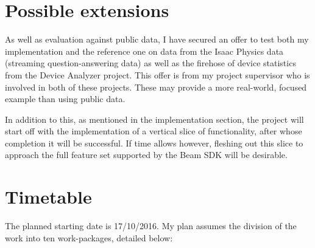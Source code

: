 \documentclass[11pt]{scrartcl}
\begin{document}
\section*{Possible extensions}

As well as evaluation against public data, I have secured an offer to test both my implementation and the reference one on data from the Isaac Physics \cite{Isaac} data (streaming question-answering data) as well as the firehose of device statistics from the Device Analyzer \cite{Device} project. This offer is from my project supervisor who is involved in both of these projects. These may provide a more real-world, focused example than using public data.

In addition to this, as mentioned in the implementation section, the project will start off with the implementation of a vertical slice of functionality, after whose completion it will be successful. If time allows however, fleshing out this slice to approach the full feature set supported by the Beam SDK will be desirable.


\section*{Timetable}

The planned starting date is 17/10/2016. My plan assumes the division of the work into ten work-packages, detailed below:
\end{document}
